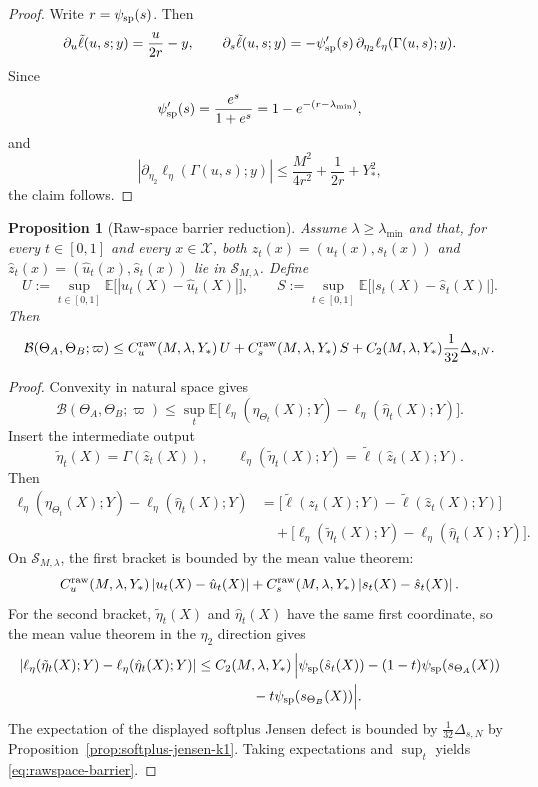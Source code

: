 \documentclass[11pt]{article}
\newtheorem{proposition}[theorem]{Proposition}
\theoremstyle{definition}
\newcommand{\E}{\mathbb{E}}
\newcommand{\abs}[1]{\left\lvert #1 \right\rvert}
\newcommand{\mc}[1]{\mathcal{#1}}
\newcommand{\cB}{\mathcal{B}}
\begin{document}
\begin{proof}
Write $r=\psi_{\rm sp}(s)$. Then
\[
  \partial_u\tilde\ell(u,s;y)=\frac{u}{2r}-y,
  \qquad
  \partial_s\tilde\ell(u,s;y)
  =
  -\psi_{\rm sp}'(s)\,\partial_{\eta_2}\ell_\eta(\Gamma(u,s);y).
\]
Since
\[
  \psi_{\rm sp}'(s)
  =
  \frac{e^s}{1+e^s}
  =
  1-e^{-(r-\lambda_{\min})},
\]
and
\[
  \abs{\partial_{\eta_2}\ell_\eta(\Gamma(u,s);y)}
  \le
  \frac{M^2}{4r^2}+\frac1{2r}+Y_\ast^2,
\]
the claim follows.
\end{proof}

\begin{proposition}[Raw-space barrier reduction]
\label{prop:rawspace-barrier}
Assume $\lambda\ge \lambda_{\min}$ and that, for every $t\in[0,1]$ and every
$x\in\mc{X}$, both
$z_t(x)=(u_t(x),s_t(x))$ and $\hat z_t(x)=(\hat u_t(x),\hat s_t(x))$ lie in
$\mathcal S_{M,\lambda}$. Define
\[
  U:=\sup_{t\in[0,1]}\E\big[\abs{u_t(X)-\hat u_t(X)}\big],
  \qquad
  S:=\sup_{t\in[0,1]}\E\big[\abs{s_t(X)-\hat s_t(X)}\big].
\]
Then
\begin{equation}
  \cB(\Theta_A,\Theta_B;\varpi)
  \le
  C_u^{\rm raw}(M,\lambda,Y_\ast)\,U
  +
  C_s^{\rm raw}(M,\lambda,Y_\ast)\,S
  +
  C_2(M,\lambda,Y_\ast)\frac1{32}\Delta_{s,N}.
  \label{eq:rawspace-barrier}
\end{equation}
\end{proposition}

\begin{proof}
Convexity in natural space gives
\[
  \cB(\Theta_A,\Theta_B;\varpi)
  \le
  \sup_t
  \E\big[
    \ell_\eta(\eta_{\Theta_t}(X);Y)-\ell_\eta(\hat\eta_t(X);Y)
  \big].
\]
Insert the intermediate output
\[
  \tilde\eta_t(X)=\Gamma(\hat z_t(X)),
  \qquad
  \ell_\eta(\tilde\eta_t(X);Y)=\tilde\ell(\hat z_t(X);Y).
\]
Then
\begin{align*}
  \ell_\eta(\eta_{\Theta_t}(X);Y)-\ell_\eta(\hat\eta_t(X);Y)
  &=
  \bigl[
    \tilde\ell(z_t(X);Y)-\tilde\ell(\hat z_t(X);Y)
  \bigr]
  \\
  &\quad+
  \bigl[
    \ell_\eta(\tilde\eta_t(X);Y)-\ell_\eta(\hat\eta_t(X);Y)
  \bigr].
\end{align*}
On $\mathcal S_{M,\lambda}$, the first bracket is bounded by the mean value
theorem:
\[
  C_u^{\rm raw}(M,\lambda,Y_\ast)\abs{u_t(X)-\hat u_t(X)}
  +
  C_s^{\rm raw}(M,\lambda,Y_\ast)\abs{s_t(X)-\hat s_t(X)}.
\]
For the second bracket, $\tilde\eta_t(X)$ and $\hat\eta_t(X)$ have the same
first coordinate, so the mean value theorem in the $\eta_2$ direction gives
\begin{align*}
  \abs{
    \ell_\eta(\tilde\eta_t(X);Y)-\ell_\eta(\hat\eta_t(X);Y)
  }
  &\le
  C_2(M,\lambda,Y_\ast)\,
  \Bigl|
    \psi_{\rm sp}(\hat s_t(X))
    -(1-t)\psi_{\rm sp}(s_{\Theta_A}(X))
  \\
  &\qquad\qquad
    -t\psi_{\rm sp}(s_{\Theta_B}(X))
  \Bigr|.
\end{align*}
The expectation of the displayed softplus Jensen defect is bounded by
$\frac1{32}\Delta_{s,N}$ by Proposition~\ref{prop:softplus-jensen-k1}. Taking
expectations and $\sup_t$ yields \eqref{eq:rawspace-barrier}.
\end{proof}
\end{document}

